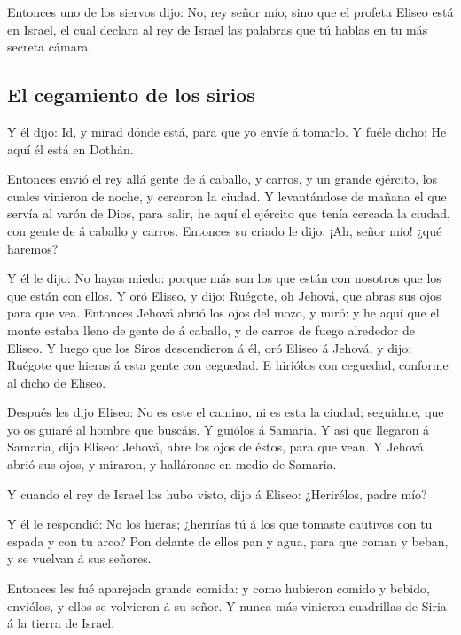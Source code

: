 Entonces uno de los siervos dijo: No, rey señor mío;
sino que el profeta Eliseo está en Israel, el cual declara al rey de
Israel las palabras que tú hablas en tu más secreta cámara.

\hypertarget{el-cegamiento-de-los-sirios}{%
\subsection{El cegamiento de los
sirios}\label{el-cegamiento-de-los-sirios}}

 Y él dijo: Id, y mirad dónde está, para que yo envíe á
tomarlo. Y fuéle dicho: He aquí él está en Dothán.

 Entonces envió el rey allá gente de á caballo, y carros,
y un grande ejército, los cuales vinieron de noche, y cercaron la
ciudad.  Y levantándose de mañana el que servía al varón
de Dios, para salir, he aquí el ejército que tenía cercada la ciudad,
con gente de á caballo y carros. Entonces su criado le dijo: ¡Ah, señor
mío! ¿qué haremos?

 Y él le dijo: No hayas miedo: porque más son los que
están con nosotros que los que están con ellos.  Y oró
Eliseo, y dijo: Ruégote, oh Jehová, que abras sus ojos para que vea.
Entonces Jehová abrió los ojos del mozo, y miró: y he aquí que el monte
estaba lleno de gente de á caballo, y de carros de fuego alrededor de
Eliseo.  Y luego que los Siros descendieron á él, oró
Eliseo á Jehová, y dijo: Ruégote que hieras á esta gente con ceguedad. E
hiriólos con ceguedad, conforme al dicho de Eliseo.

 Después les dijo Eliseo: No es este el camino, ni es
esta la ciudad; seguidme, que yo os guiaré al hombre que buscáis. Y
guiólos á Samaria.  Y así que llegaron á Samaria, dijo
Eliseo: Jehová, abre los ojos de éstos, para que vean. Y Jehová abrió
sus ojos, y miraron, y halláronse en medio de Samaria.

 Y cuando el rey de Israel los hubo visto, dijo á Eliseo:
¿Herirélos, padre mío?

 Y él le respondió: No los hieras; ¿herirías tú á los que
tomaste cautivos con tu espada y con tu arco? Pon delante de ellos pan y
agua, para que coman y beban, y se vuelvan á sus señores.

 Entonces les fué aparejada grande comida: y como
hubieron comido y bebido, enviólos, y ellos se volvieron á su señor. Y
nunca más vinieron cuadrillas de Siria á la tierra de Israel.

